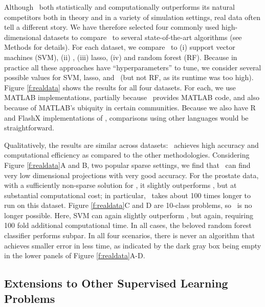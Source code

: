 \documentclass[10pt]{article}
\begin{document}
Although \Lol~both statistically and computationally outperforms its natural competitors both in theory and in a variety of simulation settings, real data often tell a different story.
%
We have  therefore selected four commonly used high-dimensional datasets to compare \Lol~to several state-of-the-art algorithms (see Methods for details).  For each dataset, we compare \Lol~to (i) support vector machines (SVM), (ii) \Road, (iii) lasso, (iv) and random forest (RF).  Because in practice all these approaches have ``hyperparameters'' to tune, we consider several possible values for  SVM, lasso, and \Lol~(but not RF, as its runtime was too high).  Figure \ref{f:realdata} shows the results for all four datasets. For each, we use MATLAB implementations, partially because \Road~provides MATLAB code, and also because of MATLAB's ubiquity in certain communities.  Because we also have R and FlashX implementations of \Lol, comparisons using other languages would be straightforward.





Qualitatively, the results are similar across datasets: \Lol~achieves high accuracy and computational efficiency as compared to the other methodologies.  Considering Figure \ref{f:realdata}A and B, two popular sparse settings, we find that \Lol~can find very low dimensional projections with very good accuracy. For the prostate data, with a sufficiently non-sparse solution for \Road, it slightly outperforms \Lol, but at substantial computational cost; in particular, \Road~takes about 100 times longer to run on this dataset.   Figure \ref{f:realdata}C and D are 10-class problems, so \Road~is no longer possible.  Here, SVM can again slightly outperform \Lol, but again, requiring 100 fold additional computational time.  In all cases, the beloved random forest classifier performs subpar. In all four scenarios, there is never an algorithm that achieves smaller error in less time, as indicated by the dark gray box being empty in the lower panels of Figure \ref{f:realdata}A-D.


\subsection*{Extensions to Other Supervised Learning Problems}
\end{document}
